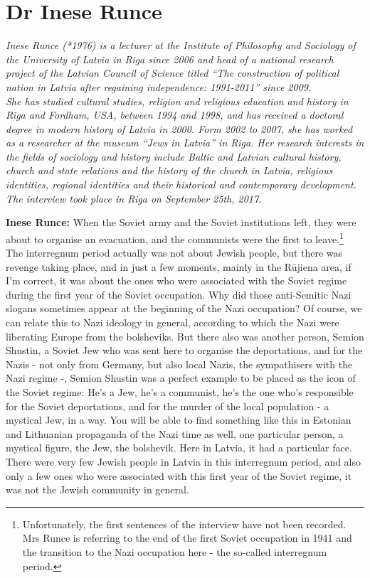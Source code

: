 \section{Dr Inese Runce}

\textit{Inese Runce (*1976) is a lecturer at the Institute of Philosophy and Sociology of the University of Latvia in Riga since 2006 and head of a national research project of the Latvian  Council of Science titled ``The construction  of political nation in Latvia after regaining independence: 1991-2011'' since 2009.\\
She has studied cultural studies, religion and religious education and history in Riga and Fordham, USA, between 1994 and 1998, and has received a doctoral degree in modern history of Latvia in 2000. Form 2002 to 2007, she has worked as a researcher at the museum ``Jews in Latvia'' in Riga. Her research interests in the fields of sociology and history include Baltic and Latvian cultural history, church and state relations and the history of the church in Latvia, religious identities, regional identities and their historical and contemporary development.\\
The interview took place in Riga on September 25th, 2017.}\par
\vspace*{2em}
\textbf{Inese Runce:} When the Soviet army and the Soviet institutions left, they were about to organise an evacuation, and the communists were the first to leave.\footnote{Unfortunately, the first sentences of the interview have not been recorded. Mrs Runce is referring to the end of the first Soviet occupation in 1941 and the transition to the Nazi occupation here - the so-called interregnum period.}\\
The interregnum period actually was not about Jewish people, but there was revenge taking place, and in just a few moments, mainly in the Rūjiena area, if I'm correct, it was about the ones who were associated with the Soviet regime during the first year of the Soviet occupation. Why did those anti-Semitic Nazi slogans sometimes appear at the beginning of the Nazi occupation? Of course, we can relate this to Nazi ideology in general, according to which the Nazi were liberating Europe from the bolsheviks. But there also was another person, Semion Shustin, a Soviet Jew who was sent here to organise the  deportations, and for the Nazis - not only from Germany, but also local Nazis, the sympathisers with the Nazi regime -, Semion Shustin was a perfect example to be placed as the icon of the Soviet regime: He's a Jew, he's a communist, he's the one who's responsible for the Soviet deportations, and for the murder of the local population - a mystical Jew, in a way. You will be able to find something like this in Estonian and Lithuanian propaganda of the Nazi time as well, one particular person, a mystical figure, the Jew, the bolshevik. Here in Latvia, it had a particular face. There were very few Jewish people in Latvia in this interregnum period, and also only a few ones who were associated with this first year of the Soviet regime, it was not the Jewish community in general.
	
